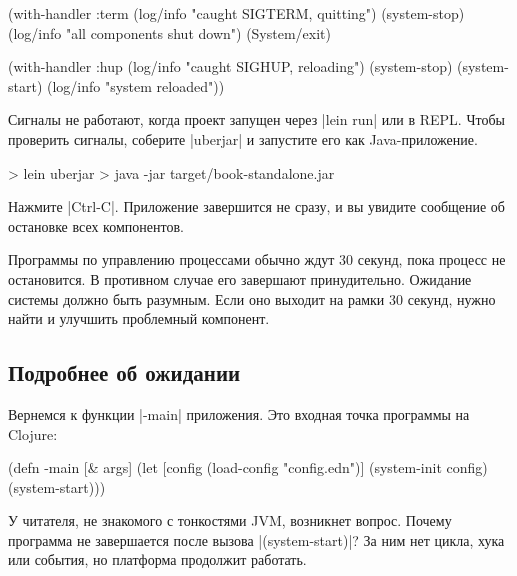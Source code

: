 \begin{english}
  \begin{clojure}
(with-handler :term
  (log/info "caught SIGTERM, quitting")
  (system-stop)
  (log/info "all components shut down")
  (System/exit)
  \end{clojure}
\end{english}

\begin{english}
  \begin{clojure}
(with-handler :hup
  (log/info "caught SIGHUP, reloading")
  (system-stop)
  (system-start)
  (log/info "system reloaded"))
  \end{clojure}
\end{english}

Сигналы не работают, когда проект запущен через \spverb|lein run| или в
REPL. Чтобы проверить сигналы, соберите \spverb|uberjar| и запустите его как
Java-приложение.

\begin{english}
  \begin{bash}
> lein uberjar
> java -jar target/book-standalone.jar
  \end{bash}
\end{english}

Нажмите \spverb|Ctrl-C|. Приложение завершится не сразу, и вы увидите сообщение
об остановке всех компонентов.

Программы по управлению процессами обычно ждут 30 секунд, пока процесс не
остановится. В противном случае его завершают принудительно. Ожидание системы
должно быть разумным. Если оно выходит на рамки 30 секунд, нужно найти и
улучшить проблемный компонент.

\subsection{Подробнее об ожидании}

Вернемся к функции \spverb|-main| приложения. Это входная точка программы на
Clojure:

\begin{english}
  \begin{clojure}
(defn -main [& args]
  (let [config (load-config "config.edn")]
    (system-init config)
    (system-start)))
  \end{clojure}
\end{english}

У читателя, не знакомого с тонкостями JVM, возникнет вопрос. Почему программа не
завершается после вызова \spverb|(system-start)|? За ним нет цикла, хука или
события, но платформа продолжит работать.

